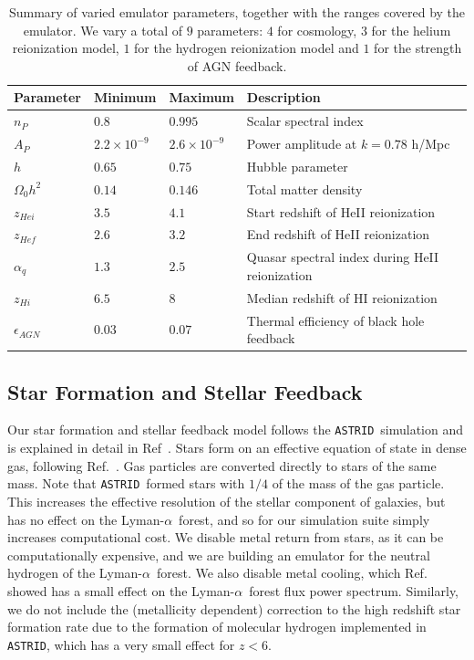 \documentclass[a4paper,11pt]{article}
\newcommand{\Lya}{Lyman-$\alpha$}
\newcommand{\astrid}{\texttt{ASTRID}}
\begin{document}
\begin{table}
\begin{centering}
  \begin{tabular}{llll}
  \hline
  Parameter & Minimum & Maximum & Description \\
    \hline
    $n_P$  &  $0.8$  & $0.995$ & Scalar spectral index \\
    $A_P$  &  $2.2 \times 10^{-9}$  & $2.6 \times 10^{-9}$ & Power amplitude at $k = 0.78$ h/Mpc \\
    $h$    & $0.65$  & $0.75$ & Hubble parameter \\
    $\Omega_0 h^2$ & $0.14$ & $0.146$ & Total matter density \\
    $z_{Hei}$      & $3.5$  & $4.1$  & Start redshift of HeII reionization \\
    $z_{Hef}$      & $2.6$  & $3.2$  & End redshift of HeII reionization \\
    $\alpha_q$     & $1.3$  & $2.5$ & Quasar spectral index during HeII reionization  \\
    $z_{Hi}$        & $6.5$ & $8$   & Median redshift of HI reionization \\
    $\epsilon_{AGN}$ & $0.03$ & $0.07$ & Thermal efficiency of black hole feedback \\
    \hline
  \end{tabular}
  \caption{Summary of varied emulator parameters, together with the ranges covered by the emulator. We vary a total of $9$ parameters: $4$ for cosmology, $3$ for the helium reionization model, $1$ for the hydrogen reionization model and $1$ for the strength of AGN feedback.}
  \label{tab:emulatorparams}
  \end{centering}
\end{table}

\subsection{Star Formation and Stellar Feedback}
\label{sec:stellar}

Our star formation and stellar feedback model follows the \astrid~simulation and is explained in detail in Ref~\cite{Bird:2022}.
Stars form on an effective equation of state in dense gas, following Ref.~\cite{Springel:2003}. Gas particles are converted directly to stars of the same mass. Note that \astrid~formed stars with $1/4$ of the mass of the gas particle. This increases the effective resolution of the stellar component of galaxies, but has no effect on the \Lya~forest, and so for our simulation suite simply increases computational cost. We disable metal return from stars, as it can be computationally expensive, and we are building an emulator for the neutral hydrogen of the \Lya~forest. We also disable metal cooling, which Ref.~\cite{Viel:2013} showed has a small effect on the \Lya~forest flux power spectrum. Similarly, we do not include the (metallicity dependent) correction to the high redshift star formation rate due to the formation of molecular hydrogen implemented in \astrid, which has a very small effect for $z < 6$.
\end{document}
